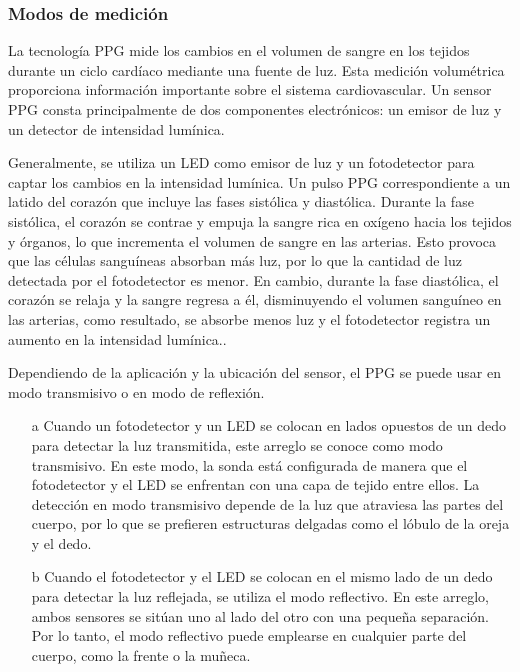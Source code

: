         \subsubsection{Modos de medición}
            La tecnología PPG mide los cambios en el volumen de sangre en los tejidos durante un ciclo cardíaco mediante una fuente de luz. Esta medición volumétrica proporciona información importante sobre el sistema cardiovascular. Un sensor PPG consta principalmente de dos componentes electrónicos: un emisor de luz y un detector de intensidad lumínica.

            Generalmente, se utiliza un LED como emisor de luz y un fotodetector para captar los cambios en la intensidad lumínica. Un pulso PPG correspondiente a un latido del corazón que incluye las fases sistólica y diastólica. Durante la fase sistólica, el corazón se contrae y empuja la sangre rica en oxígeno hacia los tejidos y órganos, lo que incrementa el volumen de sangre en las arterias. Esto provoca que las células sanguíneas absorban más luz, por lo que la cantidad de luz detectada por el fotodetector es menor. En cambio, durante la fase diastólica, el corazón se relaja y la sangre regresa a él, disminuyendo el volumen sanguíneo en las arterias, como resultado, se absorbe menos luz y el fotodetector registra un aumento en la intensidad lumínica.\cite{Hiiberia_2023}.

            Dependiendo de la aplicación y la ubicación del sensor, el PPG se puede usar en modo transmisivo o en modo de reflexión.

            \begin{enumerate}
                \item [a] Cuando un fotodetector y un LED se colocan en lados opuestos de un dedo para detectar la luz transmitida, este arreglo se conoce como modo transmisivo. En este modo, la sonda está configurada de manera que el fotodetector y el LED se enfrentan con una capa de tejido entre ellos. La detección en modo transmisivo depende de la luz que atraviesa las partes del cuerpo, por lo que se prefieren estructuras delgadas como el lóbulo de la oreja y el dedo.
                \item [b] Cuando el fotodetector y el LED se colocan en el mismo lado de un dedo para detectar la luz reflejada, se utiliza el modo reflectivo. En este arreglo, ambos sensores se sitúan uno al lado del otro con una pequeña separación. Por lo tanto, el modo reflectivo puede emplearse en cualquier parte del cuerpo, como la frente o la muñeca.
            \end{enumerate}

